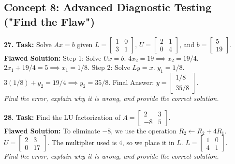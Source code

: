 \documentclass[11pt]{article}
\begin{document}
\subsection*{Concept 8: Advanced Diagnostic Testing ("Find the Flaw")}
\textbf{27.} \textbf{Task:} Solve $Ax = b$ given $L = \begin{bmatrix} 1 & 0 \\ 3 & 1 \end{bmatrix}$, $U = \begin{bmatrix} 2 & 1 \\ 0 & 4 \end{bmatrix}$, and $b = \begin{bmatrix} 5 \\ 19 \end{bmatrix}$. \\
\textbf{Flawed Solution:} Step 1: Solve $Ux = b$. $4x_2 = 19 \implies x_2 = 19/4$. $2x_1 + 19/4 = 5 \implies x_1 = 1/8$. Step 2: Solve $Ly = x$. $y_1 = 1/8$. $3(1/8) + y_2 = 19/4 \implies y_2 = 35/8$. Final Answer: $y = \begin{bmatrix} 1/8 \\ 35/8 \end{bmatrix}$. \\
\textit{Find the error, explain why it is wrong, and provide the correct solution.}

\textbf{28.} \textbf{Task:} Find the LU factorization of $A = \begin{bmatrix} 2 & 3 \\ -8 & 5 \end{bmatrix}$. \\
\textbf{Flawed Solution:} To eliminate $-8$, we use the operation $R_2 \leftarrow R_2 + 4R_1$. $U = \begin{bmatrix} 2 & 3 \\ 0 & 17 \end{bmatrix}$. The multiplier used is $4$, so we place it in $L$. $L = \begin{bmatrix} 1 & 0 \\ 4 & 1 \end{bmatrix}$. \\
\textit{Find the error, explain why it is wrong, and provide the correct solution.}
\end{document}
